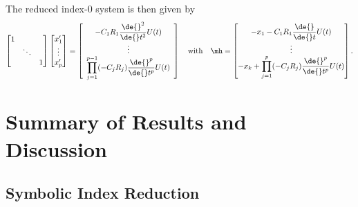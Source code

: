 %
The reduced index-0 system is then given by
%
\begin{equation}
  \begin{bmatrix}
    1 & & \\
    & \ddots & \\
    & & 1 \\
  \end{bmatrix}
  \begin{bmatrix}
    x_1^{\prime} \\ \vdots \\ x_p^{\prime}
  \end{bmatrix} = \left[\begin{array}{c}
    -C_1R_1 \dfrac{\de{}^{2}}{\de{}t^{2}}U(t) \\
    \vdots \\
    \displaystyle\prod_{j=1}^{p-1} (-C_j R_j) \dfrac{\de{}^{p}}{\de{}t^{p}}U(t)
  \end{array}\right]
  \quad \text{with} \quad
  \mh = \begin{bmatrix}
    -x_{1} - C_1R_1 \dfrac{\de{}}{\de{}t}U(t) \\
    \vdots \\
    -x_k + \displaystyle\prod_{j=1}^{p} (-C_j R_j) \dfrac{\de{}^{p}}{\de{}t^{p}}U(t)
  \end{bmatrix} \text{.}
\end{equation}
%


\section{Summary of Results and Discussion}

\subsection{Symbolic Index Reduction}

